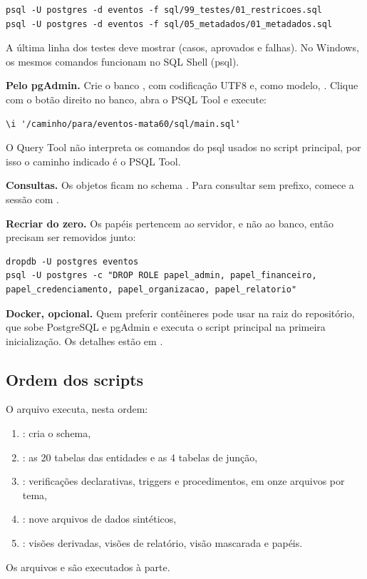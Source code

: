 \begin{lstlisting}[language={}]
psql -U postgres -d eventos -f sql/99_testes/01_restricoes.sql
psql -U postgres -d eventos -f sql/05_metadados/01_metadados.sql
\end{lstlisting}

A última linha dos testes deve mostrar  (casos, aprovados e falhas). No Windows, os mesmos comandos funcionam no SQL Shell (psql).

\textbf{Pelo pgAdmin.} Crie o banco , com codificação UTF8 e, como modelo, . Clique com o botão direito no banco, abra o PSQL Tool e execute:

\begin{lstlisting}[language={}]
\i '/caminho/para/eventos-mata60/sql/main.sql'
\end{lstlisting}

O Query Tool não interpreta os comandos do psql usados no script principal, por isso o caminho indicado é o PSQL Tool.

\textbf{Consultas.} Os objetos ficam no schema . Para consultar sem prefixo, comece a sessão com .

\textbf{Recriar do zero.} Os papéis pertencem ao servidor, e não ao banco, então precisam ser removidos junto:

\begin{lstlisting}[language={}]
dropdb -U postgres eventos
psql -U postgres -c "DROP ROLE papel_admin, papel_financeiro, papel_credenciamento, papel_organizacao, papel_relatorio"
\end{lstlisting}

\textbf{Docker, opcional.} Quem preferir contêineres pode usar  na raiz do repositório, que sobe PostgreSQL e pgAdmin e executa o script principal na primeira inicialização. Os detalhes estão em .

\subsection{Ordem dos scripts}

O arquivo  executa, nesta ordem:
\begin{enumerate}
  \item {}: cria o schema,
  \item {}: as 20 tabelas das entidades e as 4 tabelas de junção,
  \item {}: verificações declarativas, triggers e procedimentos, em onze arquivos por tema,
  \item {}: nove arquivos de dados sintéticos,
  \item {}: visões derivadas, visões de relatório, visão mascarada e papéis.
\end{enumerate}

Os arquivos  e  são executados à parte.
